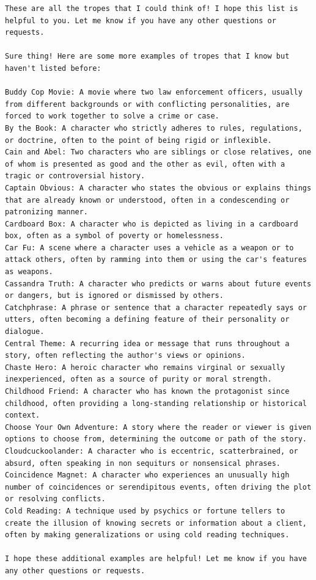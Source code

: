 \documentclass[11pt]{article}
\begin{document}
\begin{lstlisting}
These are all the tropes that I could think of! I hope this list is helpful to you. Let me know if you have any other questions or requests.

Sure thing! Here are some more examples of tropes that I know but haven't listed before:

Buddy Cop Movie: A movie where two law enforcement officers, usually from different backgrounds or with conflicting personalities, are forced to work together to solve a crime or case.
By the Book: A character who strictly adheres to rules, regulations, or doctrine, often to the point of being rigid or inflexible.
Cain and Abel: Two characters who are siblings or close relatives, one of whom is presented as good and the other as evil, often with a tragic or controversial history.
Captain Obvious: A character who states the obvious or explains things that are already known or understood, often in a condescending or patronizing manner.
Cardboard Box: A character who is depicted as living in a cardboard box, often as a symbol of poverty or homelessness.
Car Fu: A scene where a character uses a vehicle as a weapon or to attack others, often by ramming into them or using the car's features as weapons.
Cassandra Truth: A character who predicts or warns about future events or dangers, but is ignored or dismissed by others.
Catchphrase: A phrase or sentence that a character repeatedly says or utters, often becoming a defining feature of their personality or dialogue.
Central Theme: A recurring idea or message that runs throughout a story, often reflecting the author's views or opinions.
Chaste Hero: A heroic character who remains virginal or sexually inexperienced, often as a source of purity or moral strength.
Childhood Friend: A character who has known the protagonist since childhood, often providing a long-standing relationship or historical context.
Choose Your Own Adventure: A story where the reader or viewer is given options to choose from, determining the outcome or path of the story.
Cloudcuckoolander: A character who is eccentric, scatterbrained, or absurd, often speaking in non sequiturs or nonsensical phrases.
Coincidence Magnet: A character who experiences an unusually high number of coincidences or serendipitous events, often driving the plot or resolving conflicts.
Cold Reading: A technique used by psychics or fortune tellers to create the illusion of knowing secrets or information about a client, often by making generalizations or using cold reading techniques.

I hope these additional examples are helpful! Let me know if you have any other questions or requests.
\end{lstlisting}
\end{document}
